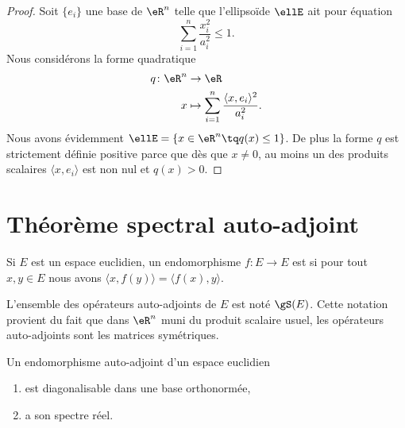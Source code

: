 \begin{proof}
    Soit \( \{ e_i \}\) une base de \( \eR^n\) telle que l'ellipsoïde \( \ellE\) ait pour équation
    \begin{equation}
        \sum_{i=1}^n\frac{ x_i^2 }{ a_i^2 }\leq 1.
    \end{equation}
    Nous considérons la forme quadratique
    \begin{equation}
        \begin{aligned}
            q\colon \eR^n&\to \eR \\
            x&\mapsto \sum_{i=1}^n\frac{ \langle x, e_i\rangle^2 }{ a_i^2 }. 
        \end{aligned}
    \end{equation}
    Nous avons évidemment \( \ellE=\{ x\in \eR^n\tq q(x)\leq 1 \}\). De plus la forme \( q\) est strictement définie positive parce que dès que \( x\neq 0\), au moins un des produits scalaires \( \langle x, e_i\rangle \) est non nul et \( q(x)> 0\).
\end{proof}

\section{Théorème spectral auto-adjoint}

\begin{definition}      \label{DEFooYNEQooGQgbCf}
    Si \( E\) est un espace euclidien, un endomorphisme \( f\colon E\to E\) est  si pour tout \( x,y\in E\) nous avons \( \langle x, f(y)\rangle=\langle f(x), y\rangle  \). 
\end{definition}
L'ensemble des opérateurs auto-adjoints de \( E\) est noté \( \gS(E)\). Cette notation provient du fait que dans \( \eR^n\) muni du produit scalaire usuel, les opérateurs auto-adjoints sont les matrices symétriques.

\begin{theorem} \label{ThoRSBahHH}
    Un endomorphisme auto-adjoint d'un espace euclidien
    \begin{enumerate}
        \item
            est diagonalisable dans une base orthonormée,
        \item
            a son spectre réel.
    \end{enumerate}
\end{theorem}

